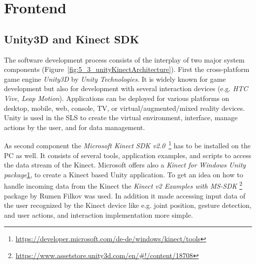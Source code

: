 \section{Frontend}\label{5_4_software}
\subsection{Unity3D and Kinect SDK}
The software development process consists of the interplay of two major system components (Figure~\ref{fig:5_3_unityKinectArchitecture}).
First the cross-platform game engine \textit{Unity3D} by \textit{Unity Technologies}. It is widely known for game development but also for development with several interaction devices (e.g. \textit{HTC Vive}, \textit{Leap Motion}). Applications can be deployed for various platforms on desktop, mobile, web, console, TV, or virtual/augmented/mixed reality devices.
Unity is used in the SLS to create the virtual environment, interface, manage actions by the user, and for data management.

As second component the \textit{Microsoft Kinect SDK v2.0}~\footnote{\label{fn:kinectTools}\url{https://developer.microsoft.com/de-de/windows/kinect/tools}} has to be installed on the PC as well. It consists of several tools, application examples, and scripts to access the data stream of the Kinect. Microsoft offers also a \textit{Kinect for Windows Unity package}\cref{fn:kinectTools}, to create a Kinect based Unity application.
To get an idea on how to handle incoming data from the Kinect the \textit{Kinect v2 Examples with MS-SDK} \footnote{\url{https://www.assetstore.unity3d.com/en/\#!/content/18708}} package by Rumen Filkov was used. In addition it made accessing input data of the user recognized by the Kinect device like e.g. joint position, gesture detection, and user actions, and interaction implementation more simple.


